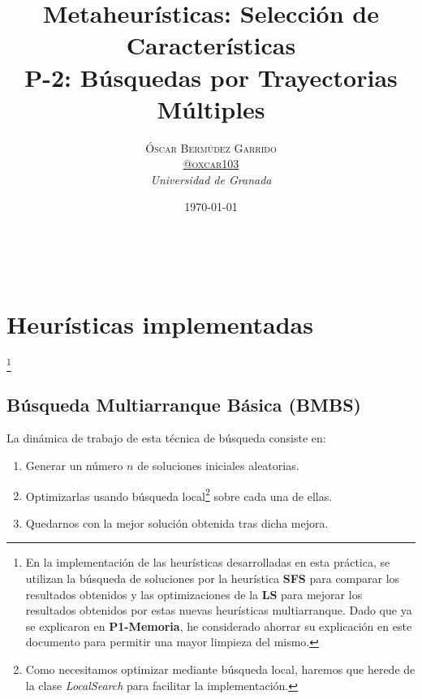 \documentclass[a4paper, 11pt]{article}
\title{\textbf{Metaheurísticas: Selección de Características}\\ %
P-2: Búsquedas por Trayectorias Múltiples} %
\author{\textsc{Óscar Bermúdez Garrido\\
\href{http://www.github.com/oxcar103}{@oxcar103}} %
\\{\textit{Universidad de Granada}}} %
\date{\today} %
\makeatletter
\renewcommand{\maketitle}{
  \begin{flushright} %
  {\LARGE\@title} %
  
  \vspace{50pt} %
  
  {\large\@author} %
  \\\@date %
  \vspace{40pt} %
  \end{flushright}
}
\makeatother
\begin{document}
\maketitle %

\renewcommand{\abstractname}{Resumen} %



{\parskip=2pt
  \tableofcontents
}
\pagebreak

	
	
	
	\section{Heurísticas implementadas}\footnote{En la implementación de las heurísticas desarrolladas
	en esta práctica, se utilizan la búsqueda de soluciones por la heurística \textbf{SFS} para comparar
	los resultados obtenidos y las optimizaciones de la \textbf{LS} para mejorar los resultados obtenidos
	por estas nuevas heurísticas multiarranque. Dado que ya se explicaron en \textbf{P1-Memoria}, he
	considerado ahorrar su explicación en este documento para permitir una mayor limpieza del mismo.}
		\subsection{Búsqueda Multiarranque Básica (\textbf{BMBS})}
			La dinámica de trabajo de esta técnica de búsqueda consiste en:
			\begin{enumerate}
				\item Generar un número $n$ de soluciones iniciales aleatorias.
				\item Optimizarlas usando búsqueda local\footnote{Como necesitamos optimizar mediante
				búsqueda local, haremos que herede de la clase \textit{LocalSearch} para facilitar
				la implementación.} sobre cada una de ellas.
				\item Quedarnos con la mejor solución obtenida tras dicha mejora.
			\end{enumerate}
			
\end{document}
